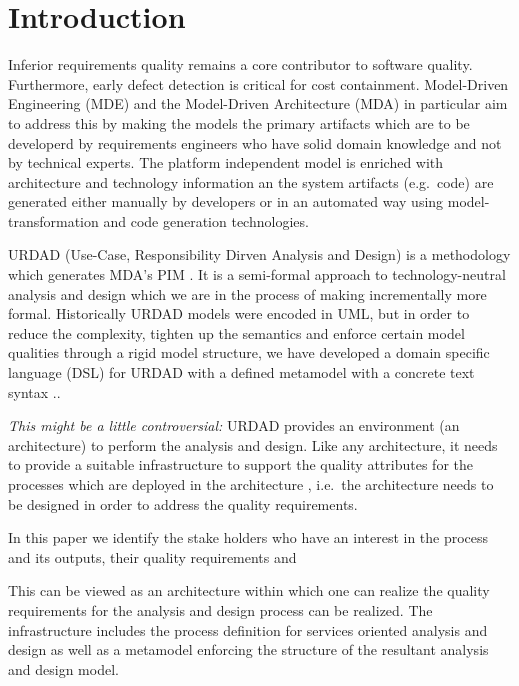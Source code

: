 \section{Introduction}\label{sec:Introduction}

Inferior requirements quality remains a core contributor to software quality\cite{heck_experiences_2008,_strategies_2011}. Furthermore, early defect detection is critical for cost containment\cite{betterRefernceThanBoehm1981WhichReliesOnWaterfall}. Model-Driven Engineering (MDE) and the Model-Driven Architecture (MDA) in particular aim to address this by making the models the primary artifacts which are to be developerd by requirements engineers who have solid domain knowledge and not by technical experts. The platform independent model is enriched with architecture and technology information an the system artifacts (e.g.\ code) are generated either manually by developers or in an automated way using model-transformation and code generation technologies.

URDAD (Use-Case, Responsibility Dirven Analysis and Design) \cite{solms_technology_2007} is a methodology which generates MDA's PIM \cite{solms_generating_2009}. It is a semi-formal \cite{solms_urdad_2010} approach to technology-neutral analysis and design which we are in the process of making incrementally more formal. Historically URDAD models were encoded in UML, but in order to reduce the complexity, tighten up the semantics and enforce certain model qualities through a rigid model structure, we have developed a domain specific language (DSL) for URDAD with a defined metamodel with a concrete text syntax \cite{solmsfritz_domain-specific_????}..

\emph{This might be a little controversial:} URDAD provides an environment (an architecture) to perform the analysis and design. Like any architecture, it needs to provide a suitable infrastructure to support the quality attributes for the processes which are deployed in the architecture \cite{}, i.e.\ the architecture needs to be designed in order to address the quality requirements.

In this paper we identify the stake holders who have an interest in the process and its outputs, their quality requirements and

This can be viewed as an architecture within which one can realize the quality requirements for the analysis and design process can be realized. The infrastructure includes the process definition for services oriented analysis and design as well as a metamodel enforcing the structure of the resultant analysis and design model.


